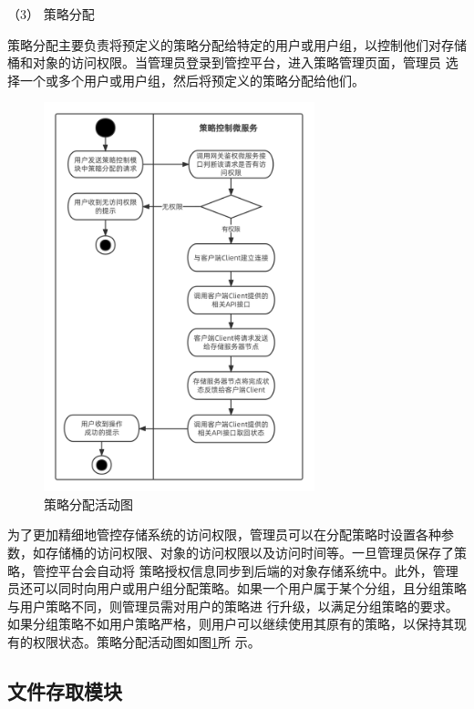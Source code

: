 （3） 策略分配




策略分配主要负责将预定义的策略分配给特定的用户或用户组，以控制他们对存储桶和对象的访问权限。当管理员登录到管控平台，进入策略管理页面，管理员
选择一个或多个用户或用户组，然后将预定义的策略分配给他们。

\begin{figure}[h]
    \centering
    \includegraphics[width=0.7\textwidth]{my_figures/chapter4/策略分配活动图.png}
    \caption{策略分配活动图}
    \label{fig:策略分配活动图}
\end{figure}

为了更加精细地管控存储系统的访问权限，管理员可以在分配策略时设置各种参数，如存储桶的访问权限、对象的访问权限以及访问时间等。一旦管理员保存了策略，管控平台会自动将
策略授权信息同步到后端的对象存储系统中。此外，管理员还可以同时向用户或用户组分配策略。如果一个用户属于某个分组，且分组策略与用户策略不同，则管理员需对用户的策略进
行升级，以满足分组策略的要求。如果分组策略不如用户策略严格，则用户可以继续使用其原有的策略，以保持其现有的权限状态。策略分配活动图如图\ref{fig:策略分配活动图}所
示。



\subsection{文件存取模块}

